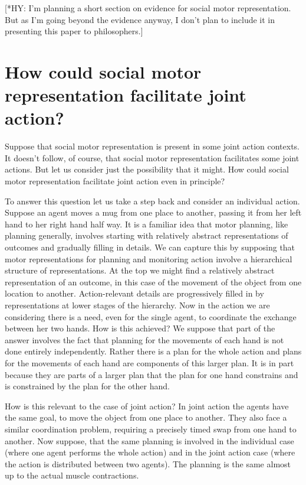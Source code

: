 \documentclass[12pt,\papersize]{extarticle}
\begin{document}
[*HY: I'm planning a short section on evidence for social motor representation.  But as I'm going beyond the evidence anyway, I don't plan to include it in presenting this paper to philosophers.]

\section{How could social motor representation facilitate joint action?}
Suppose that social motor representation is present in some joint action contexts.
It doesn't follow, of course, that social motor representation facilitates some joint actions.
But let us consider just the possibility that it might.
How could social motor representation facilitate joint action even in principle?

To answer this question
let us take a step back and consider an individual action.
Suppose an agent moves a mug from one place to another, passing it from her left hand to her right hand half way.
It is a familiar idea that motor planning, like planning generally, involves starting with relatively abstract representations of outcomes and gradually filling in details.
We can capture this by supposing that 
motor representations for planning and monitoring action involve a hierarchical structure of representations.
At the top we might find a relatively abstract representation of an outcome, in this case of the movement of the object from one location to another.
Action-relevant details are progressively filled in by representations at lower stages of the hierarchy. 
Now in the action we are considering there is a need, even for the single agent, to coordinate the exchange between her two hands.
How is this achieved? 
We suppose that part of the answer involves the fact that planning for the movements of each hand is not done entirely independently.
Rather there is a plan for the whole action
and plans for the movements of each hand are components of this larger plan.
It is in part because they are parts of a larger plan that the plan for one hand constrains and is constrained by the plan for the other hand.


How is this relevant to the case of joint action?
In joint action the agents have the same goal, to move the object from one place to another.
They also face a similar coordination problem, requiring a precisely timed swap from one hand to another.
Now suppose, that the same planning is involved in the individual case (where one agent performs the whole action) and in the joint action case (where the action is distributed between two agents).
The planning is the same almost up to the actual muscle contractions.
\end{document}
